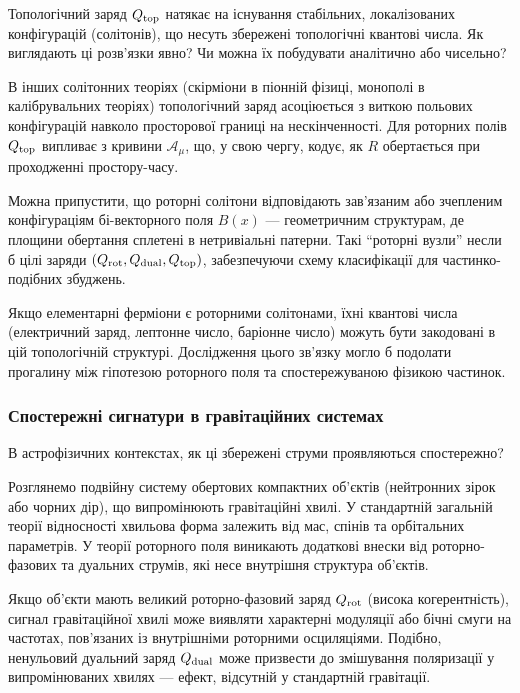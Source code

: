 \documentclass[11pt,a4paper]{article}
\numberwithin{equation}{section}
\theoremstyle{plain}
\theoremstyle{definition}
\theoremstyle{remark}
\begin{document}
Топологічний заряд $Q_{\rm top}$ натякає на існування стабільних, локалізованих конфігурацій (солітонів), що несуть збережені топологічні квантові числа. Як виглядають ці розв'язки явно? Чи можна їх побудувати аналітично або чисельно?

В інших солітонних теоріях (скірміони в піонній фізиці, монополі в калібрувальних теоріях) топологічний заряд асоціюється з виткою польових конфігурацій навколо просторової границі на нескінченності. Для роторних полів $Q_{\rm top}$ випливає з кривини $\mathcal{A}_\mu$, що, у свою чергу, кодує, як $R$ обертається при проходженні простору-часу.

Можна припустити, що роторні солітони відповідають зав'язаним або зчепленим конфігураціям бі-векторного поля $B(x)$ — геометричним структурам, де площини обертання сплетені в нетривіальні патерни. Такі ``роторні вузли'' несли б цілі заряди $(Q_{\rm rot}, Q_{\rm dual}, Q_{\rm top})$, забезпечуючи схему класифікації для частинко-подібних збуджень.

Якщо елементарні ферміони є роторними солітонами, їхні квантові числа (електричний заряд, лептонне число, баріонне число) можуть бути закодовані в цій топологічній структурі. Дослідження цього зв'язку могло б подолати прогалину між гіпотезою роторного поля та спостережуваною фізикою частинок.

\subsubsection{Спостережні сигнатури в гравітаційних системах}

В астрофізичних контекстах, як ці збережені струми проявляються спостережно?

Розглянемо подвійну систему обертових компактних об'єктів (нейтронних зірок або чорних дір), що випромінюють гравітаційні хвилі. У стандартній загальній теорії відносності хвильова форма залежить від мас, спінів та орбітальних параметрів. У теорії роторного поля виникають додаткові внески від роторно-фазових та дуальних струмів, які несе внутрішня структура об'єктів.

Якщо об'єкти мають великий роторно-фазовий заряд $Q_{\rm rot}$ (висока когерентність), сигнал гравітаційної хвилі може виявляти характерні модуляції або бічні смуги на частотах, пов'язаних із внутрішніми роторними осциляціями. Подібно, ненульовий дуальний заряд $Q_{\rm dual}$ може призвести до змішування поляризації у випромінюваних хвилях — ефект, відсутній у стандартній гравітації.
\end{document}
